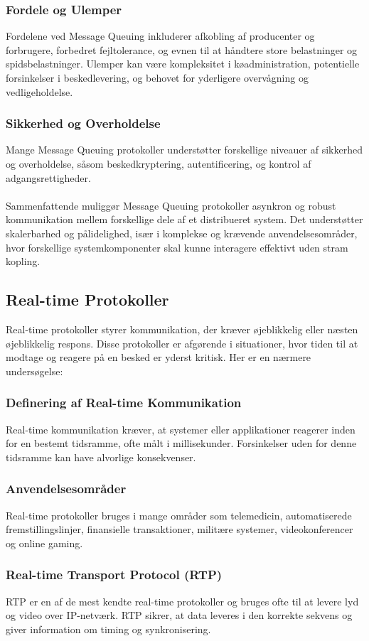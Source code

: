\subsubsection{Fordele og Ulemper}	
Fordelene ved Message Queuing inkluderer afkobling af producenter og forbrugere, forbedret fejltolerance, og evnen til at håndtere store belastninger og spidsbelastninger. Ulemper kan være kompleksitet i køadministration, potentielle forsinkelser i beskedlevering, og behovet for yderligere overvågning og vedligeholdelse.
\subsubsection{Sikkerhed og Overholdelse}
Mange Message Queuing protokoller understøtter forskellige niveauer af sikkerhed og overholdelse, såsom beskedkryptering, autentificering, og kontrol af adgangsrettigheder.
\\
\\
Sammenfattende muliggør Message Queuing protokoller asynkron og robust kommunikation mellem forskellige dele af et distribueret system. Det understøtter skalerbarhed og pålidelighed, især i komplekse og krævende anvendelsesområder, hvor forskellige systemkomponenter skal kunne interagere effektivt uden stram kopling.
\subsection{Real-time Protokoller}
Real-time protokoller styrer kommunikation, der kræver øjeblikkelig eller næsten øjeblikkelig respons. Disse protokoller er afgørende i situationer, hvor tiden til at modtage og reagere på en besked er yderst kritisk. Her er en nærmere undersøgelse:
\subsubsection{Definering af Real-time Kommunikation}
Real-time kommunikation kræver, at systemer eller applikationer reagerer inden for en bestemt tidsramme, ofte målt i millisekunder. Forsinkelser uden for denne tidsramme kan have alvorlige konsekvenser.
\subsubsection{Anvendelsesområder}
Real-time protokoller bruges i mange områder som telemedicin, automatiserede fremstillingslinjer, finansielle transaktioner, militære systemer, videokonferencer og online gaming.
\subsubsection{Real-time Transport Protocol (RTP)}
RTP er en af de mest kendte real-time protokoller og bruges ofte til at levere lyd og video over IP-netværk. RTP sikrer, at data leveres i den korrekte sekvens og giver information om timing og synkronisering.
